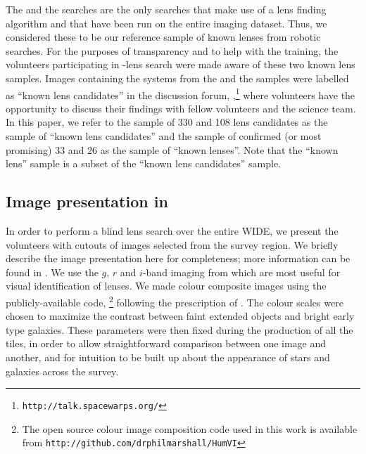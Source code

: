 \documentclass[useAMS,usenatbib,a4paper]{mn2e}
\begin{document}
The \rf and the \af searches are the only searches that make use of a
lens finding algorithm and that have been run on the entire \cfhtls
imaging dataset.  Thus, we considered these to be our reference sample of known
lenses from robotic searches. For the purposes of transparency and to
help with the training, the volunteers participating in \sw-\cfhtls lens
search were made aware of these two known lens samples. Images
containing the systems from the \rf and the \af samples were labelled as
``known lens candidates'' in the \sw discussion forum,
\Talk,\footnote{\texttt{http://talk.spacewarps.org/}} where volunteers have the
opportunity to discuss their findings with fellow volunteers and the
science team. In this paper, we refer to the sample of 330 \rf and 108
\af lens candidates as the sample of ``known lens candidates'' and the
sample of confirmed (or most promising) 33 \rf and 26 \af as the sample
of ``known lenses''. Note that the ``known lens'' sample is a subset of
the ``known lens candidates'' sample.


\subsection{Image presentation in \sw}
\label{sec:data:impres}

In order to perform a blind lens search over the entire \cfhtls
WIDE, we present the volunteers with cutouts of images selected
from the survey region. We briefly describe the image presentation here
for completeness; more information can be found in \PaperOne. We use
the $g$, $r$ and $i$-band imaging from \cfhtls which are most useful for
visual identification of lenses.  We made colour composite images using
the publicly-available code, \humvi\footnote{The open source  colour image
composition code used in this work is available from
\texttt{http://github.com/drphilmarshall/HumVI}} following the
prescription of \citet{Lupton2004}. The colour scales were chosen to
maximize the contrast between faint extended objects and bright early
type galaxies. These parameters
were then fixed during the production of all the tiles, in order to allow
straightforward comparison between one image and another, and for
intuition to be built up about the appearance of stars and galaxies
across the survey.
\end{document}
